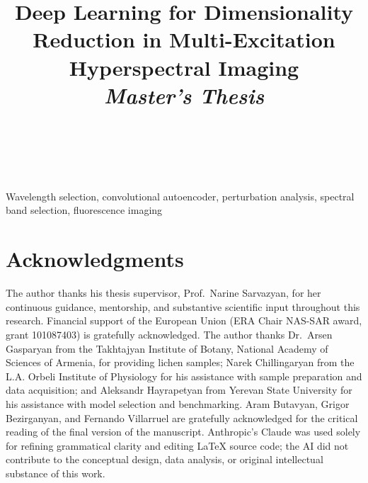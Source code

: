 \documentclass[journal]{IEEEtran}
\begin{document}
\title{Deep Learning for Dimensionality Reduction in Multi-Excitation Hyperspectral Imaging\\
\vspace{0.4em}\large \textit{Master's Thesis}}

\author{\\
\\[0.6em]
}


\maketitle

% 
% 


% 
%
\begin{IEEEkeywords}
Wavelength selection, convolutional autoencoder, perturbation analysis, spectral band selection, fluorescence imaging
\end{IEEEkeywords}

%
%








% 
% 
\section*{Acknowledgments}
The author thanks his thesis supervisor, Prof.\ Narine Sarvazyan, for her continuous guidance, mentorship, and substantive scientific input throughout this research.
Financial support of the European Union (ERA Chair NAS-SAR award, grant 101087403) is gratefully acknowledged.
The author thanks Dr.\ Arsen Gasparyan from the Takhtajyan Institute of Botany, National Academy of Sciences of Armenia, for providing lichen samples; Narek Chillingaryan from the L.A. Orbeli Institute of Physiology for his assistance with sample preparation and data acquisition; and Aleksandr Hayrapetyan from Yerevan State University for his assistance with model selection and benchmarking.
Aram Butavyan, Grigor Bezirganyan, and Fernando Villarruel are gratefully acknowledged for the critical reading of the final version of the manuscript.
Anthropic's Claude was used solely for refining grammatical clarity and editing LaTeX source code; the AI did not contribute to the conceptual design, data analysis, or original intellectual substance of this work.
\end{document}
